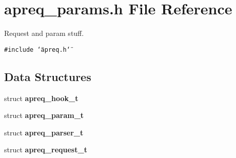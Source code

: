 \section{apreq\_\-params.h File Reference}
\label{apreq__params_8h}
Request and param stuff. 


{\tt \#include \char`\"{}apreq.h\char`\"{}}\par
\subsection*{Data Structures}
\begin{CompactItemize}
\item 
struct {\bf apreq\_\-hook\_\-t}
\item 
struct {\bf apreq\_\-param\_\-t}
\item 
struct {\bf apreq\_\-parser\_\-t}
\item 
struct {\bf apreq\_\-request\_\-t}
\end{CompactItemize}
